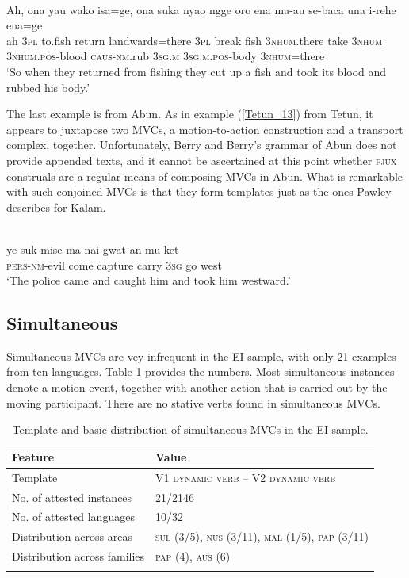 \ea \label{Tidore_87}
\\
\gll Ah, ona yau wako isa=ge, ona suka nyao ngge oro ena ma-au se-baca una i-rehe ena=ge \\
ah 3\textsc{pl} to.fish return landwards=there 3\textsc{pl} break fish 3\textsc{nhum}.there take 3\textsc{nhum} 3\textsc{nhum}.\textsc{pos}-blood \textsc{caus}-\textsc{nm}.rub 3\textsc{sg}.\textsc{m} 3\textsc{sg}.\textsc{m}.\textsc{pos}-body 3\textsc{nhum}=there \\
\glft ‘So when they returned from fishing they cut up a fish and took its blood and rubbed his body.’\\ 
\z

The last example is from Abun. As in example (\ref{Tetun_13}) from Tetun, it appears to juxtapose two MVCs, a motion-to-action construction and a transport complex, together. Unfortunately, Berry and Berry's grammar of Abun does not provide appended texts, and it cannot be ascertained at this point whether \textsc{fjux} construals are a regular means of composing MVCs in Abun. What is remarkable with such conjoined MVCs is that they form templates just as the ones Pawley describes for Kalam.

\ea \label{Abun_4}
\\
\gll ye-suk-mise ma nai gwat an mu ket \\
\textsc{pers}-\textsc{nm}-evil come capture carry 3\textsc{sg} go west \\
\glft `The police came and caught him and took him westward.'\\ 
\z

\subsection{Simultaneous} \label{sec:simultaneous}

Simultaneous \textsc{MVC}s are vey infrequent in the EI sample, with only 21 examples from ten languages. Table \ref{table:simultaneous} provides the numbers. Most simultaneous instances denote a motion event, together with another action that is carried out by the moving participant. There are no stative verbs found in simultaneous MVCs.

\begin{table}
\begin{tabular}{ll}
\lsptoprule
Feature&Value\tabularnewline
\midrule
Template& V1 \textsc{dynamic verb} -- V2 \textsc{dynamic verb}\tabularnewline
No. of attested instances& 21/2146 \tabularnewline
No. of attested languages& 10/32 \tabularnewline
Distribution across areas& \textsc{sul} (3/5), \textsc{nus} (3/11), \textsc{mal} (1/5), \textsc{pap} (3/11) \tabularnewline
Distribution across families& \textsc{pap} (4), \textsc{aus} (6) \tabularnewline
\lspbottomrule
\end{tabular}
\caption[Template and basic distribution of simultaneous MVCs]{Template and basic distribution of simultaneous MVCs in the EI sample.}
\label{table:simultaneous}
\end{table}

